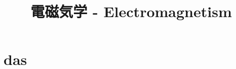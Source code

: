 \documentclass[a4paper]{jsreport}
\title{電磁気学 - Electromagnetism}
\begin{document}
    \maketitle

    \tableofcontents

    \chapter{das}
\end{document}
